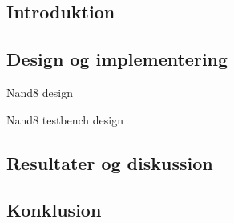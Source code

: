 \documentclass[../journal.tex]{subfiles}
\begin{document}
\subsection{Introduktion}

\subsection{Design og implementering}

\begin{table}[H]
    \centering
      \framebox{
        \rule{8pt}{0pt}
          
  }
  \caption{Nand8 design}	
  \label{src:nand8}
\end{table}

\begin{table}[H]
    \centering
      \framebox{
        \rule{8pt}{0pt}
          
  }
  \caption{Nand8 testbench design}	
  \label{src:nand8_test}
\end{table}

\subsection{Resultater og diskussion}

\subsection{Konklusion}
\end{document}
